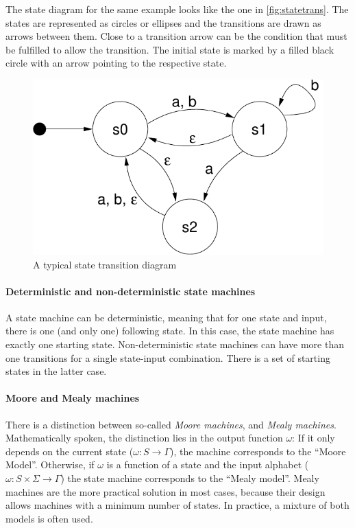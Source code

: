 \documentclass[a4paper,12pt,BCOR6mm,bibtotoc,idxtotoc]{scrbook}
\begin{document}
The state diagram for the same example looks like the one in
\autoref{fig:statetrans}. The states are represented as circles or
ellipses and the transitions are drawn as arrows between them. Close
to a transition arrow can be the condition that must be fulfilled to
allow the transition. The initial state is marked by a filled black
circle with an arrow pointing to the respective state.

\begin{figure}[htbp]
  \centering
  \includegraphics[width=.5\textwidth]{images/statetrans}
  \caption{A typical state transition diagram}
  \label{fig:statetrans}
\end{figure}

\paragraph{Deterministic and non-deterministic state machines}

A state machine can be deterministic, meaning that for one state and
input, there is one (and only one) following state. In this case, the
state machine has exactly one starting state. Non-deterministic state
machines can have more than one transitions for a single state-input
combination. There is a set of starting states in the latter case.

\paragraph{Moore and Mealy machines}

There is a distinction between so-called \textit{Moore machines}, and
\textit{Mealy machines}. Mathematically spoken, the distinction lies
in the output function $\omega$: If it only depends on the current
state ($\omega: S \rightarrow \Gamma$), the machine corresponds to the
``Moore Model''. Otherwise, if $\omega$ is a function of a state and
the input alphabet ($\omega: S \times \Sigma \rightarrow \Gamma$) the
state machine corresponds to the ``Mealy model''. Mealy machines are
the more practical solution in most cases, because their design allows
machines with a minimum number of states. In practice, a mixture of
both models is often used.
\end{document}
